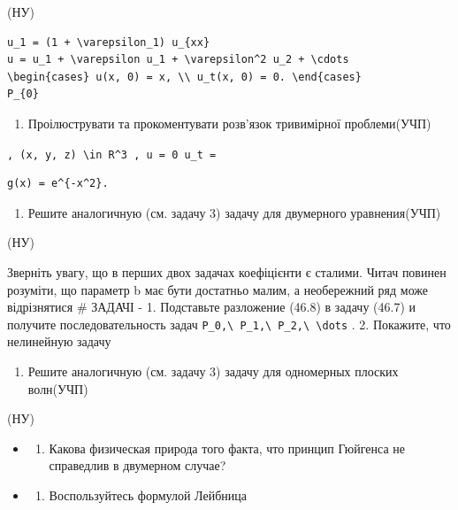 \documentclass[
  ukrainian,
]{article}
\providecommand{\tightlist}{%
  \setlength{\itemsep}{0pt}\setlength{\parskip}{0pt}}
\begin{document}
(НУ)

\begin{verbatim}
u_1 = (1 + \varepsilon_1) u_{xx}
u = u_1 + \varepsilon u_1 + \varepsilon^2 u_2 + \cdots
\begin{cases} u(x, 0) = x, \\ u_t(x, 0) = 0. \end{cases}
P_{0}
\end{verbatim}

\begin{enumerate}
\def\labelenumi{\arabic{enumi}.}
\setcounter{enumi}{2}
\tightlist
\item
  Проілюструвати та прокоментувати розв'язок тривимірної проблеми(УЧП)
\end{enumerate}

\texttt{,\ \textquotesingle{}(x,\ y,\ z)\ \textbackslash{}in\ R\^{}3\textquotesingle{}\ ,\ \textquotesingle{}u\ =\ 0\textquotesingle{}\ u\_t\ =}

\begin{verbatim}
g(x) = e^{-x^2}.
\end{verbatim}

\begin{enumerate}
\def\labelenumi{\arabic{enumi}.}
\setcounter{enumi}{3}
\tightlist
\item
  Решите аналогичную (см. задачу 3) задачу для двумерного уравнения(УЧП)
\end{enumerate}

(НУ)

Зверніть увагу, що в перших двох задачах коефіцієнти є сталими. Читач
повинен розуміти, що параметр b має бути достатньо малим, а необережний
ряд може відрізнятися \# ЗАДАЧІ - 1. Подставьте разложение (46.8) в
задачу (46.7) и получите последовательность задач
\texttt{P\_0,\textbackslash{}\ P\_1,\textbackslash{}\ P\_2,\textbackslash{}\ \textbackslash{}dots}
. 2. Покажите, что нелинейную задачу

\begin{enumerate}
\def\labelenumi{\arabic{enumi}.}
\setcounter{enumi}{4}
\tightlist
\item
  Решите аналогичную (см. задачу 3) задачу для одномерных плоских
  волн(УЧП)
\end{enumerate}

(НУ)

\begin{itemize}
\tightlist
\item
  \begin{enumerate}
  \def\labelenumi{\arabic{enumi}.}
  \setcounter{enumi}{5}
  \tightlist
  \item
    Какова физическая природа того факта, что принцип Гюйгенса не
    справедлив в двумерном случае?
  \end{enumerate}
\item
  \begin{enumerate}
  \def\labelenumi{\arabic{enumi}.}
  \setcounter{enumi}{6}
  \tightlist
  \item
    Воспользуйтесь формулой Лейбница
  \end{enumerate}
\end{itemize}
\end{document}
